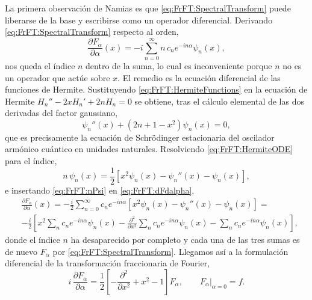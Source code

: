 			La primera observación de Namias es que \eqref{eq:FrFT:SpectralTransform} puede liberarse de la base y escribirse como un operador diferencial. Derivando \eqref{eq:FrFT:SpectralTransform} respecto al orden,
			\begin{equation}\label{eq:FrFT:dFdalpha}
				\frac{\partial F_{\alpha}}{\partial \alpha}(x) = -i\sum_{n=0}^{\infty}n\,c_{n}e^{-in\alpha}\psi_{n}(x),
			\end{equation}
			nos queda el índice $n$ dentro de la suma, lo cual es inconveniente porque $n$ no es un operador que actúe sobre $x$. El remedio es la ecuación diferencial de las funciones de Hermite. Sustituyendo \eqref{eq:FrFT:HermiteFunctions} en la ecuación de Hermite $H_{n}'' - 2xH_{n}' + 2nH_{n} = 0$ se obtiene, tras el cálculo elemental de las dos derivadas del factor gaussiano,
			\begin{equation}\label{eq:FrFT:HermiteODE}
				\psi_{n}''(x) + \left(2n+1-x^{2}\right)\psi_{n}(x) = 0,
			\end{equation}
			que es precisamente la ecuación de Schrödinger estacionaria del oscilador armónico cuántico en unidades naturales. Resolviendo \eqref{eq:FrFT:HermiteODE} para el índice,
			\begin{equation}\label{eq:FrFT:nPsi}
				n\,\psi_{n}(x) = \frac{1}{2}\left[x^{2}\psi_{n}(x) - \psi_{n}''(x) - \psi_{n}(x)\right],
			\end{equation}
			e insertando \eqref{eq:FrFT:nPsi} en \eqref{eq:FrFT:dFdalpha},
			\begin{align*}
				& \frac{\partial F_{\alpha}}{\partial \alpha}(x) = -\frac{i}{2}\sum_{n=0}^{\infty}c_{n}e^{-in\alpha}\left[x^{2}\psi_{n}(x) - \psi_{n}''(x) - \psi_{n}(x)\right] = \\
				& -\frac{i}{2}\left[x^{2}\sum_{n}c_{n}e^{-in\alpha}\psi_{n}(x) - \frac{\partial^{2}}{\partial x^{2}}\sum_{n}c_{n}e^{-in\alpha}\psi_{n}(x) - \sum_{n}c_{n}e^{-in\alpha}\psi_{n}(x)\right],
			\end{align*}
			donde el índice $n$ ha desaparecido por completo y cada una de las tres sumas es de nuevo $F_{\alpha}$ por \eqref{eq:FrFT:SpectralTransform}. Llegamos así a la formulación diferencial de la transformación fraccionaria de Fourier,
			\begin{equation}\label{eq:FrFT:PDE}
				i\,\frac{\partial F_{\alpha}}{\partial \alpha} = \frac{1}{2}\left[-\frac{\partial^{2}}{\partial x^{2}} + x^{2} - 1\right]F_{\alpha}, \qquad F_{\alpha}\big|_{\alpha=0} = f.
			\end{equation}

